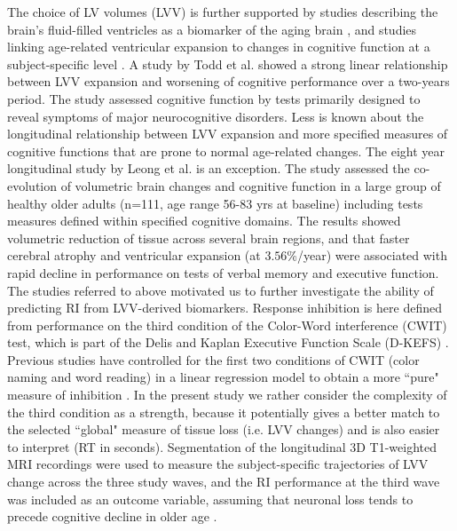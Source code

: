 \documentclass[10pt,letterpaper]{article}
\begin{document}
The choice of LV volumes (LVV) is further supported by studies describing the brain's fluid-filled ventricles as a biomarker of the aging brain \cite{Preul2006,Scahill2003}, and studies linking age-related ventricular expansion to changes in cognitive function at a subject-specific level \cite{Carmichael2007a, Carmichael2007b , Madsen2015}. 
A study by Todd et al. \cite{Todd2017} showed a strong linear relationship between LVV expansion and worsening of cognitive performance over a two-years period. The study assessed cognitive function by tests primarily designed to reveal symptoms of major neurocognitive disorders. Less is known about the longitudinal relationship between LVV expansion and more specified measures of cognitive functions that are prone to normal age-related changes. The eight year longitudinal study by Leong et al. \cite{Leong2017} is an exception. The study assessed the co-evolution of volumetric brain changes and cognitive function in a large group of healthy older adults (n=111, age range 56-83 yrs at baseline) including tests measures defined within specified cognitive domains. The results showed volumetric reduction of tissue across several brain regions, and that faster cerebral atrophy and ventricular expansion (at $3.56$\%/year) 
were associated with rapid decline in performance on tests of verbal memory and executive function. \\

The studies referred to above motivated us to further investigate the ability of predicting RI from LVV-derived biomarkers. 
Response inhibition is here defined from performance on the third condition of the Color-Word interference (CWIT) test, which is part of the Delis and Kaplan Executive Function Scale (D-KEFS) \cite{Delis2001}. 
Previous studies have controlled for the first two conditions of CWIT (color naming and word reading) in a linear regression model to obtain a more ``pure" measure of inhibition \cite{Adolfsdottir2014, Adolfsdottir2017}. 
In the present study we rather consider the complexity of the third condition as a strength, because it potentially gives a better match to the selected ``global" measure of tissue loss (i.e. LVV changes) and is also easier to interpret (RT in seconds).
Segmentation of the longitudinal 3D T1-weighted MRI recordings were used to measure the subject-specific trajectories of LVV change across the three study waves, and the RI performance at the third wave was included as an outcome variable, assuming that neuronal loss tends to precede cognitive decline in older age \cite{Reuter-Lorenz2014}. 
\end{document}
